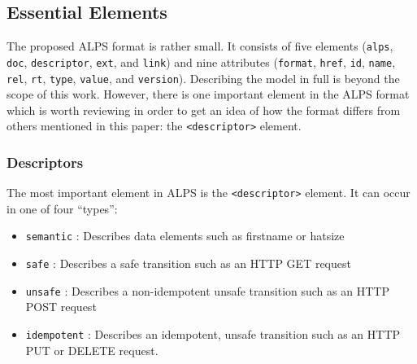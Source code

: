 \documentclass{wsrest2014}
\begin{document}
\hypertarget{_essential_elements}{}
\subsection{Essential Elements}
\label{_essential_elements}
 \par{}The proposed ALPS format is rather small. It consists of five elements (\texttt{alps}, \texttt{doc}, \texttt{descriptor}, \texttt{ext}, and \texttt{link}) and nine attributes (\texttt{format}, \texttt{href}, \texttt{id}, \texttt{name}, \texttt{rel}, \texttt{rt}, \texttt{type}, \texttt{value}, and \texttt{version}). Describing the model in full is beyond the scope of this work. However, there is one important element in the ALPS format which is worth reviewing in order to get an idea of how the format differs from others mentioned in this paper: the \texttt{\textless{}descriptor\textgreater{}} element.
\hypertarget{_descriptors}{}
\subsubsection{Descriptors}
\label{_descriptors}
 \par{}The most important element in ALPS is the \texttt{\textless{}descriptor\textgreater{}} element. It can occur in one of four ``types'':

\begin{itemize}

\item%
\texttt{semantic} :
   Describes data elements such as \textquotedbl{}firstname\textquotedbl{} or \textquotedbl{}hatsize\textquotedbl{}

\item%
\texttt{safe} :
   Describes a safe transition such as an HTTP GET request

\item%
\texttt{unsafe} :
   Describes a non-idempotent unsafe transition such as an HTTP POST request

\item%
\texttt{idempotent} :
   Describes an idempotent, unsafe transition such as an HTTP PUT or DELETE request.

\end{itemize}
\end{document}
